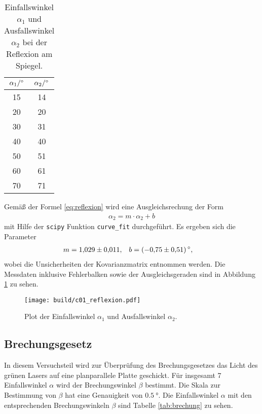 \begin{table}[H]
    \centering
    \caption[short]{Einfallswinkel $\alpha_1$ und Ausfallswinkel $\alpha_2$ bei der Reflexion am Spiegel.}
    \label{tab:reflexion}
    \begin{tabular}{S S}
        \toprule
        {$\alpha_1 / \unit[]{\degree}$} & {$\alpha_2 / \unit[]{\degree}$} \\
        \midrule
        15 & 14 \\
        20 & 20 \\
        30 & 31 \\
        40 & 40 \\
        50 & 51 \\
        60 & 61 \\
        70 & 71 \\
        \bottomrule
    \end{tabular}
\end{table}

\noindent
Gemäß der Formel \eqref{eq:reflexion} wird eine Ausgleichsrechung der Form
\begin{align}
    \alpha_2 = m \cdot \alpha_2 + b
\end{align}
mit Hilfe der \texttt{scipy} \cite[]{scipy} Funktion \texttt{curve\_fit} durchgeführt.
Es ergeben sich die Parameter
\begin{align}
    m &= \num[]{1.029 +- 0.011}, & b &= (\num[]{-0.75 +- 0.51}) \, \unit[]{\degree},
\end{align}
wobei die Unsicherheiten der Kovarianzmatrix entnommen werden.
Die Messdaten inklusive Fehlerbalken sowie der Ausgleichsgeraden sind in Abbildung \ref{fig:reflexion} zu sehen.

\begin{figure}[H]
    \centering
    \texttt{[image: build/c01\_reflexion.pdf]}
    \caption[]{Plot der Einfallswinkel $\alpha_1$ und Ausfallswinkel $\alpha_2$.}
    \label{fig:reflexion}
\end{figure}






\subsection{Brechungsgesetz}
\label{sec:ausw_brechung}
In diesem Versuchsteil wird zur Überprüfung des Brechungsgesetzes das Licht des grünen Lasers auf eine planparallele Platte geschickt.
Für insgesamt 7 Einfallswinkel $\alpha$ wird der Brechungswinkel $\beta$ bestimmt.
Die Skala zur Bestimmung von $\beta$ hat eine Genauigkeit von $\qty[]{0.5}{\degree}$.
Die Einfallswinkel $\alpha$ mit den entsprechenden Brechungswinkeln $\beta$ sind Tabelle \ref{tab:brechung} zu sehen.

